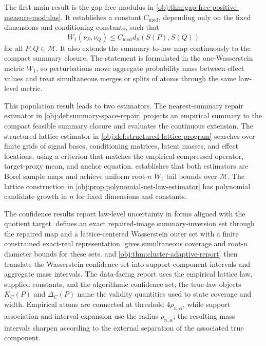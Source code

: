 The first main result is the gap-free modulus in \cref{obj:thm:gap-free-positive-measure-modulus}.  It establishes a constant \(C_{\mathrm{mod}}\), depending only on the fixed dimensions and conditioning constants, such that
\[
W_1(\nu_P,\nu_Q)\le C_{\mathrm{mod}}d_S(S(P),S(Q))
\]
for all \(P,Q\in\mathcal M\).  It also extends the summary-to-law map continuously to the compact summary closure.  The statement is formulated in the one-Wasserstein metric \(W_1\), so perturbations move aggregate probability mass between effect values and treat simultaneous merges or splits of atoms through the same law-level metric.

This population result leads to two estimators.  The nearest-summary repair estimator in \cref{obj:def:summary-space-repair} projects an empirical summary to the compact feasible summary closure and evaluates the continuous extension.  The structured-lattice estimator in \cref{obj:def:structured-lattice-program} searches over finite grids of signal bases, conditioning matrices, latent masses, and effect locations, using a criterion that matches the empirical compressed operator, target-proxy mean, and anchor equation.   establishes that both estimators are Borel sample maps and achieve uniform root-\(n\) \(W_1\) tail bounds over \(\mathcal M\).  The lattice construction in \cref{obj:prop:polynomial-net-law-estimator} has polynomial candidate growth in \(n\) for fixed dimensions and constants.

The confidence results report law-level uncertainty in forms aligned with the quotient target.   defines an exact repaired-image summary-inversion set through the repaired map and a lattice-centered Wasserstein outer set with a finite constrained exact-real representation.   gives simultaneous coverage and root-\(n\) diameter bounds for these sets.   and \cref{obj:thm:cluster-adaptive-report} then translate the Wasserstein confidence set into support-component intervals and aggregate mass intervals.  The data-facing report uses the empirical lattice law, supplied constants, and the algorithmic confidence set; the true-law objects \(K_C(P)\) and \(\Delta_C(P)\) name the validity quantities used to state coverage and width.  Empirical atoms are connected at threshold \(4\rho_{n,\alpha}\), while support association and interval expansion use the radius \(\rho_{n,\alpha}\); the resulting mass intervals sharpen according to the external separation of the associated true component.

